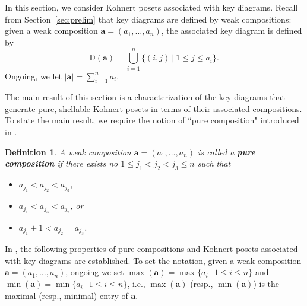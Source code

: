 \documentclass[letterpaper,10pt]{article}
\newtheorem{definition}[theorem]{Definition}
\begin{document}
In this section, we consider Kohnert posets associated with key diagrams. Recall from Section~\ref{sec:prelim} that key diagrams are defined by weak compositions: given a weak composition $\mathbf{a}=(a_1,\hdots,a_n)$, the associated key diagram  is defined by $$\mathbb{D}(\mathbf{a})=\bigcup_{i=1}^n\{(i,j)~|~1\le j\le a_i\}.$$
Ongoing, we let $|\mathbf{a}|=\sum_{i=1}^na_i$.

The main result of this section is a characterization of the key diagrams that generate pure, shellable Kohnert posets in terms of their associated compositions. To state the main result, we require the notion of ``pure composition" introduced in \textbf{\cite{KPoset1}}. 

\begin{definition}
    A weak composition $\mathbf{a}=(a_1,\hdots,a_n)$ is called a \textbf{pure composition} if there exists no $1\le j_1<j_2<j_3\le n$ such that 
    \begin{itemize}
        \item $a_{j_1}<a_{j_2}<a_{j_3}$, 
        \item $a_{j_1}<a_{j_3}<a_{j_2}$, or
        \item $a_{j_1}+1<a_{j_2}=a_{j_3}$.
    \end{itemize}
\end{definition} 

In \textbf{\cite{KPoset1}}, the following properties of pure compositions and Kohnert posets associated with key diagrams are established. To set the notation, given a weak composition $\mathbf{a}=(a_1,\hdots,a_n)$, ongoing we set $\max(\mathbf{a})=\max\{a_i~|~1\le i\le n\}$ and $\min(\mathbf{a})=\min\{a_i~|~1\le i\le n\}$, i.e., $\max(\mathbf{a})$ (resp., $\min(\mathbf{a})$) is the maximal (resp., minimal) entry of $\mathbf{a}$.
\end{document}
